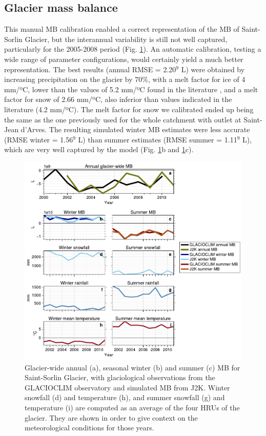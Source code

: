 \subsection{Glacier mass balance}

This manual MB calibration enabled a correct representation of the MB of Saint-Sorlin Glacier, but the interannual variability is still not well captured, particularly for the 2005-2008 period (Fig. \ref{hydro:fig4}). An automatic calibration, testing a wide range of parameter configurations, would certainly yield a much better representation. The best results (annual RMSE = 2.20$^{9}$ L) were obtained by increasing precipitation on the glacier by 70\%, with a melt factor for ice of 4 mm/ºC, lower than the values of 5.2 mm/ºC found in the literature \citep{reveillet_which_2017}, and a melt factor for snow of 2.66 mm/ºC, also inferior than values indicated in the literature (4.2 mm/ºC). The melt factor for snow we calibrated ended up being the same as the one previously used for the whole catchment with outlet at Saint-Jean d'Arves. The resulting simulated winter MB estimates were less accurate (RMSE winter = 1.56$^{9}$ L) than summer estimates (RMSE summer = 1.11$^{9}$ L), which are very well captured by the model (Fig. \ref{hydro:fig4}b and \ref{hydro:fig4}c). 

\begin{figure}[h]
\centering
\includegraphics[width=15cm]{Figures/hydro/Figure_4.pdf}
\caption{Glacier-wide annual (a), seasonal winter (b) and summer (c) MB for Saint-Sorlin Glacier, with glaciological observations from the GLACIOCLIM observatory and simulated MB from J2K. Winter snowfall (d) and temperature (h), and summer snowfall (g) and temperature (i) are computed as an average of the four HRUs of the glacier. They are shown in order to give context on the meteorological conditions for those years.} 
\label{hydro:fig4}
\end{figure}

